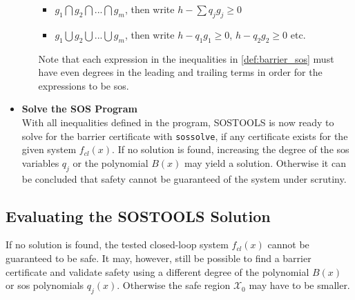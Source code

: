 \begin{itemize}
\begin{itemize}
		\begin{itemize}
			\item $g_1 \bigcap g_2 \bigcap ... \bigcap g_m$, then write $h - \sum q_jg_j\geq 0$
			\item $g_1 \bigcup g_2 \bigcup ... \bigcup g_m$, then write $h - q_1g_1\geq 0$, $h - q_2g_2\geq 0$ etc.
		\end{itemize} 
		Note that each expression in the inequalities in \autoref{def:barrier_sos} must have even degrees in the leading and trailing terms in order for the expressions to be \gls{sos}.
	\end{itemize}
	\item \textbf{Solve the SOS Program}\\
	With all inequalities defined in the program, SOSTOOLS is now ready to solve for the barrier certificate with \texttt{sossolve}, if any certificate exists for the given system $f_{cl}(x)$. If no solution is found, increasing the degree of the \gls{sos} variables $q_j$ or the polynomial $B(x)$ may yield a solution. Otherwise it can be concluded that safety cannot be guaranteed of the  system under scrutiny. 
\end{itemize}









\subsection{Evaluating the SOSTOOLS Solution}
If no solution is found, the tested closed-loop system $f_{cl}(x)$ cannot be guaranteed to be safe. It may, however, still be possible to find a barrier certificate and validate safety using a different degree of the polynomial $B(x)$ or \gls{sos} polynomials $q_j(x)$. Otherwise the safe region $\mathcal{X}_0$ may have to be smaller.

